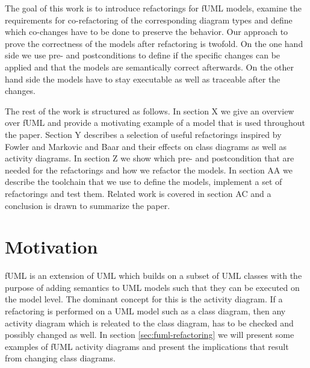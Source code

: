 \documentclass{llncs}
\begin{document}
The goal of this work is to introduce refactorings for fUML models, examine the requirements for co-refactoring of the
corresponding diagram types and define which co-changes have to be done to preserve the behavior. Our approach to prove
the correctness of the models after refactoring is twofold. On the one hand side we use pre- and postconditions
\cite{rob99} to define if the specific changes can be applied and that the models are semantically correct afterwards.
On the other hand side the models have to stay executable as well as traceable after the changes.



The rest of the work is structured as follows. In section X we give an overview over fUML and provide a motivating
example of a model that is used throughout the paper. Section Y describes a selection of useful refactorings inspired by
Fowler \cite{fow99} and Markovic and Baar \cite{DBLP:journals/sosym/MarkovicB08} and their effects on class diagrams as
well as activity diagrams. In section Z we show which pre- and postcondition that are needed for the refactorings and
how we refactor the models. In section AA we describe the toolchain that we use to define the models, implement a set of
refactorings and test them. Related work is covered in section AC and a conclusion is drawn to summarize the paper.



\section{Motivation}
fUML is an extension of UML which builds on a subset of UML classes with the purpose of adding semantics to UML models such that they can
be executed on the model level. The dominant concept for this is the activity diagram. If a refactoring is performed on a UML model such
as a class diagram, then any activity diagram which is releated to the class diagram, has to be checked and possibly changed as well. In
section \ref{sec:fuml-refactoring} we will present some examples of fUML activity diagrams and present the implications that result from
changing class diagrams.
\end{document}
